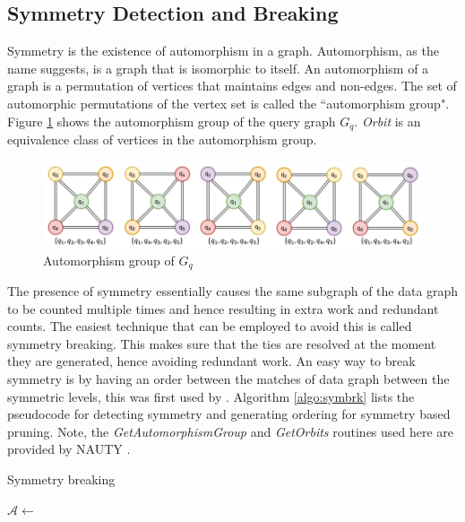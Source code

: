 \subsection{Symmetry Detection and Breaking}\label{sec:sym-detection}
Symmetry is the existence of automorphism in a graph. Automorphism, as the name suggests, is a graph that is isomorphic to itself.
An automorphism of a graph is a permutation of vertices that maintains edges and non-edges.
The set of automorphic permutations of the vertex set is called the ``automorphism group".
Figure \ref{fig:automorphism} shows the automorphism group of the query graph $G_q$.
\textit{Orbit} is an equivalence class of vertices in the automorphism group.
\begin{figure}
    \includegraphics[width=\textwidth]{fig/LR/automorphism.png}
    \caption{Automorphism group of $G_q$}
    \label{fig:automorphism}
\end{figure}

The presence of symmetry essentially causes the same subgraph of the data graph to be counted multiple times and hence resulting in extra work and redundant counts.
The easiest technique that can be employed to avoid this is called symmetry breaking. This makes sure that the ties are resolved at the moment they are generated, hence avoiding redundant work.
An easy way to break symmetry is by having an order between the matches of data graph between the symmetric levels, this was first
used by \cite{symbreak}. Algorithm \ref{algo:symbrk} lists the pseudocode for detecting symmetry and generating ordering for symmetry based pruning. Note, the \textit{GetAutomorphismGroup} and \textit{GetOrbits} routines used here are provided by NAUTY \cite{nauty}.

\begin{algorithm}
    \caption{Symmetry breaking}
    \label{algo:symbrk}
    $\mathcal{A} \leftarrow$ \;
\end{algorithm}


